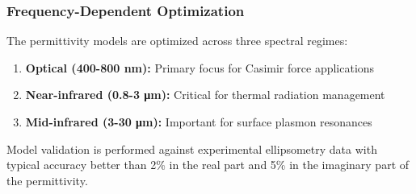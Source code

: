 \documentclass[11pt]{article}
\begin{document}
\subsubsection*{Frequency-Dependent Optimization}
The permittivity models are optimized across three spectral regimes:
\begin{enumerate}
  \item \textbf{Optical (400-800 nm):} Primary focus for Casimir force applications
  \item \textbf{Near-infrared (0.8-3 μm):} Critical for thermal radiation management
  \item \textbf{Mid-infrared (3-30 μm):} Important for surface plasmon resonances
\end{enumerate}

Model validation is performed against experimental ellipsometry data with typical accuracy better than 2\% in the real part and 5\% in the imaginary part of the permittivity.
\end{document}
